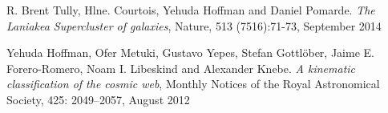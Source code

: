 \documentclass[preprint,proceedings]{rmaa}
\begin{document}
\begin{thebibliography}

 R. Brent Tully, Hlne. Courtois, Yehuda Hoffman and Daniel Pomarde. 
{\em The Laniakea Supercluster of galaxies}, Nature, 513 (7516):71-73, September 2014 
 
 Yehuda Hoffman, Ofer Metuki, Gustavo Yepes, Stefan Gottlöber, Jaime E. Forero-Romero, Noam I. Libeskind and Alexander Knebe. 
{\em A kinematic classification of the cosmic web}, Monthly Notices of the Royal Astronomical Society, 425: 2049–2057, August 2012

  
\end{thebibliography}
\end{document}

